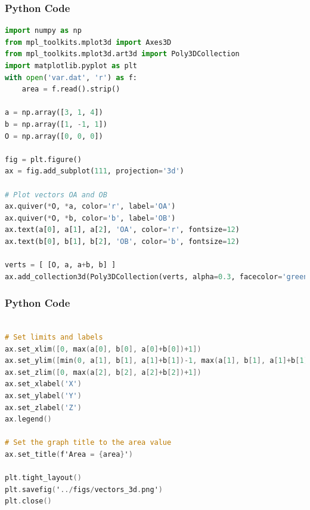\documentclass{beamer}
\begin{document}
\begin{frame}[fragile]
    \frametitle{Python Code}
    \begin{lstlisting}[language=python]
import numpy as np 
from mpl_toolkits.mplot3d import Axes3D
from mpl_toolkits.mplot3d.art3d import Poly3DCollection
import matplotlib.pyplot as plt
with open('var.dat', 'r') as f:
	area = f.read().strip()

a = np.array([3, 1, 4])
b = np.array([1, -1, 1])
O = np.array([0, 0, 0])

fig = plt.figure()
ax = fig.add_subplot(111, projection='3d')

# Plot vectors OA and OB
ax.quiver(*O, *a, color='r', label='OA')
ax.quiver(*O, *b, color='b', label='OB')
ax.text(a[0], a[1], a[2], 'OA', color='r', fontsize=12)
ax.text(b[0], b[1], b[2], 'OB', color='b', fontsize=12)

verts = [ [O, a, a+b, b] ]
ax.add_collection3d(Poly3DCollection(verts, alpha=0.3, facecolor='green'))
\end{lstlisting}
\end{frame}

\begin{frame}[fragile]
    \frametitle{Python Code}
    \begin{lstlisting}[language=C]

# Set limits and labels
ax.set_xlim([0, max(a[0], b[0], a[0]+b[0])+1])
ax.set_ylim([min(0, a[1], b[1], a[1]+b[1])-1, max(a[1], b[1], a[1]+b[1])+1])
ax.set_zlim([0, max(a[2], b[2], a[2]+b[2])+1])
ax.set_xlabel('X')
ax.set_ylabel('Y')
ax.set_zlabel('Z')
ax.legend()

# Set the graph title to the area value
ax.set_title(f'Area = {area}')

plt.tight_layout()
plt.savefig('../figs/vectors_3d.png')
plt.close()

\end{lstlisting}
\end{frame}
\end{document}

